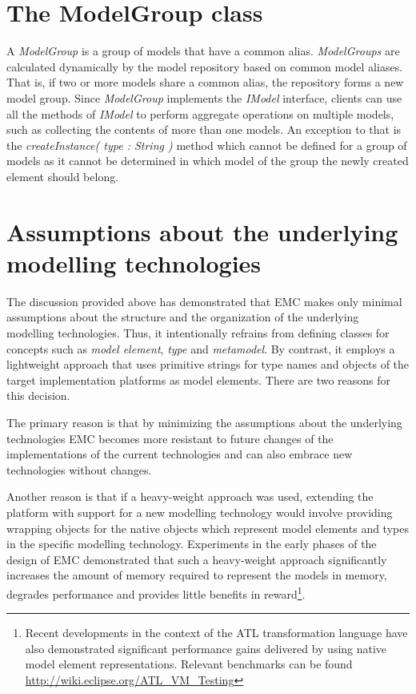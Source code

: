 \section{The ModelGroup class}

A \emph{ModelGroup} is a group of models that have a common alias. \emph{ModelGroups} are calculated dynamically by the model repository based on common model aliases. That is, if two or more models share a common alias, the repository forms a new model group. Since \emph{ModelGroup} implements the \emph{IModel} interface, clients can use all the methods of \emph{IModel} to perform aggregate operations on multiple models, such as collecting the contents of more than one models. An exception to that is the \emph{createInstance( type : String )} method which cannot be defined for a group of models as it cannot be determined in which model of the group the newly created element should belong.

\section{Assumptions about the underlying modelling technologies}

The discussion provided above has demonstrated that EMC makes only minimal assumptions about the structure and the organization of the underlying modelling technologies. Thus, it intentionally refrains from defining classes for concepts such as \emph{model element}, \emph{type} and \emph{metamodel}. By contrast, it employs a lightweight approach that uses primitive strings for type names and objects of the target implementation platforms as  model elements. There are two reasons for this decision.

The primary reason is that by minimizing the assumptions about the underlying technologies EMC becomes more resistant to future changes of the implementations of the current technologies and can also embrace new technologies without changes.

Another reason is that if a heavy-weight approach was used, extending the platform with support for a new modelling technology would involve providing wrapping objects for the native objects which represent model elements and types in the specific modelling technology. Experiments in the early phases of the design of EMC demonstrated that such a heavy-weight approach significantly increases the amount of memory required to represent the models in memory, degrades performance and provides little benefits in reward\footnote{Recent developments in the context of the ATL transformation language have also demonstrated significant performance gains delivered by using native model element representations. Relevant benchmarks can be found \url{http://wiki.eclipse.org/ATL_VM_Testing}}.

